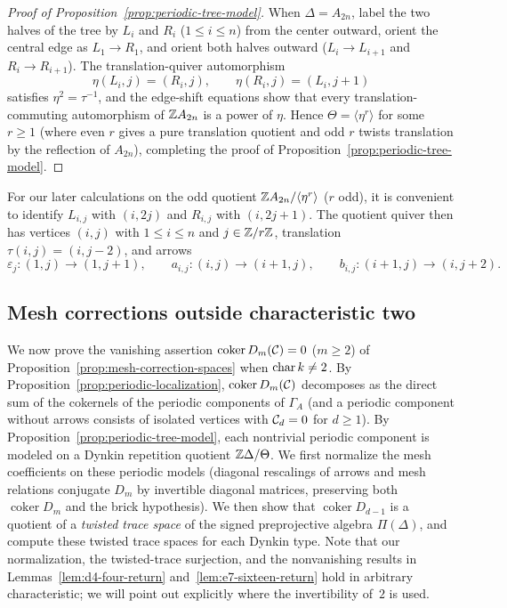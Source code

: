 \begin{proof}[Proof of Proposition~\ref{prop:periodic-tree-model}]
When $\Delta=A_{2n}$, label the two halves of the tree by $L_i$ and $R_i$ ($1\leq i\leq n$) from the center outward, orient the central edge as $L_1\to R_1$, and orient both halves outward ($L_i\to L_{i+1}$ and $R_i\to R_{i+1}$). The translation-quiver automorphism
\[
  \eta(L_i,j)=(R_i,j),\qquad \eta(R_i,j)=(L_i,j+1)
\]
satisfies $\eta^2=\tau^{-1}$, and the edge-shift equations show that every translation-commuting automorphism of $\mathbb Z A_{2n}$ is a power of $\eta$. Hence $\Theta=\langle\eta^r\rangle$ for some $r\geq1$ (where even $r$ gives a pure translation quotient and odd $r$ twists translation by the reflection of $A_{2n}$), completing the proof of Proposition~\ref{prop:periodic-tree-model}.
\end{proof}

For our later calculations on the odd quotient $\mathbb Z A_{2n}/\langle\eta^r\rangle$ ($r$ odd), it is convenient to identify $L_{i,j}$ with $(i,2j)$ and $R_{i,j}$ with $(i,2j+1)$. The quotient quiver then has vertices $(i,j)$ with $1\leq i\leq n$ and $j\in\mathbb Z/r\mathbb Z$, translation $\tau(i,j)=(i,j-2)$, and arrows
\[
  \varepsilon_j\colon(1,j)\to(1,j+1),\qquad
  a_{i,j}\colon(i,j)\to(i+1,j),\qquad
  b_{i,j}\colon(i+1,j)\to(i,j+2).
\]

\subsection{Mesh corrections outside characteristic two}
\label{app:mesh-calculations}

We now prove the vanishing assertion $\operatorname{coker}D_m(\mathcal C)=0$ ($m\geq2$) of Proposition~\ref{prop:mesh-correction-spaces} when $\operatorname{char} k\ne2$. By Proposition~\ref{prop:periodic-localization}, $\operatorname{coker}D_m(\mathcal C)$ decomposes as the direct sum of the cokernels of the periodic components of $\Gamma_A$ (and a periodic component without arrows consists of isolated vertices with $\mathcal C_d=0$ for $d\geq1$). By Proposition~\ref{prop:periodic-tree-model}, each nontrivial periodic component is modeled on a Dynkin repetition quotient $\mathbb Z\Delta/\Theta$. We first normalize the mesh coefficients on these periodic models (diagonal rescalings of arrows and mesh relations conjugate $D_m$ by invertible diagonal matrices, preserving both $\operatorname{coker}D_m$ and the brick hypothesis). We then show that $\operatorname{coker}D_{d-1}$ is a quotient of a \emph{twisted trace space} of the signed preprojective algebra $\Pi(\Delta)$, and compute these twisted trace spaces for each Dynkin type. Note that our normalization, the twisted-trace surjection, and the nonvanishing results in Lemmas~\ref{lem:d4-four-return} and~\ref{lem:e7-sixteen-return} hold in arbitrary characteristic; we will point out explicitly where the invertibility of~$2$ is used.

